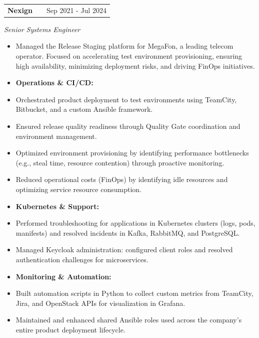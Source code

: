 \documentclass[a4paper,12pt]{article}
\makeatletter
\newenvironment{joblong}[3]
    {
    \begin{tabularx}{\linewidth}{@{}l X r@{}}
    \textbf{#1} & \hfill &  #2 \\[3.75pt]
    \end{tabularx}
    {\itshape #3}\par\vspace{2pt}
    \begin{itemize}[nosep,after=\strut, leftmargin=1em, itemsep=4pt,label=-]
    }
    {
    \end{itemize}
    }
\makeatother
\begin{document}
\begin{joblong}{Nexign}{Sep 2021 - Jul 2024}{Senior Systems Engineer}
\item[] Managed the Release Staging platform for MegaFon, a leading telecom operator. Focused on accelerating test environment provisioning, ensuring high availability, minimizing deployment risks, and driving FinOps initiatives.
\item[] \textbf{Operations \& CI/CD:}\smallskip
\item Orchestrated product deployment to test environments using TeamCity, Bitbucket, and a custom Ansible framework.
\item Ensured release quality readiness through Quality Gate coordination and environment management.
\item Optimized environment provisioning by identifying performance bottlenecks (e.g., steal time, resource contention) through proactive monitoring.
\item Reduced operational costs (FinOps) by identifying idle resources and optimizing service resource consumption.
\item[] \textbf{Kubernetes \& Support:}\smallskip
\item Performed troubleshooting for applications in Kubernetes clusters (logs, pods, manifests) and resolved incidents in Kafka, RabbitMQ, and PostgreSQL.
\item Managed Keycloak administration: configured client roles and resolved authentication challenges for microservices.
\item[] \textbf{Monitoring \& Automation:}\smallskip
\item Built automation scripts in Python to collect custom metrics from TeamCity, Jira, and OpenStack APIs for visualization in Grafana.
\item Maintained and enhanced shared Ansible roles used across the company’s entire product deployment lifecycle.
\end{joblong}
\end{document}
